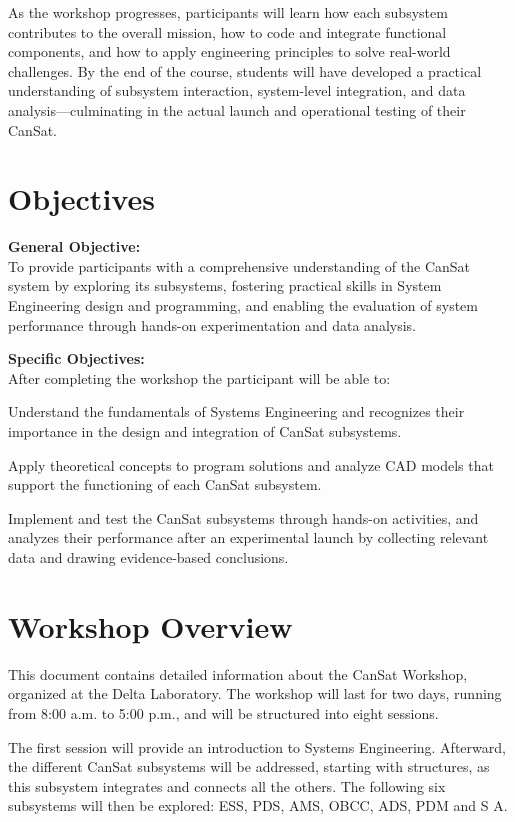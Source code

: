 \documentclass[a4paper,12pt]{article}
\begin{document}
As the workshop progresses, participants will learn how each subsystem contributes to the overall mission, how to code and integrate functional components, and how to apply engineering principles to solve real-world challenges. By the end of the course, students will have developed a practical understanding of subsystem interaction, system-level integration, and data analysis—culminating in the actual launch and operational testing of their CanSat.


\newpage

\section{Objectives}


\textbf{General Objective: }
\\
To provide participants with a comprehensive understanding of the CanSat system by exploring its subsystems, fostering practical skills in System Engineering design and programming, and enabling the evaluation of system performance through hands-on experimentation and data analysis.




\textbf{Specific Objectives:}
\\
After completing the workshop the participant will be able to:

Understand the fundamentals of Systems Engineering and recognizes their importance in the design and integration of CanSat subsystems.

Apply theoretical concepts to program solutions and analyze CAD models that support the functioning of each CanSat subsystem.

Implement and test the CanSat subsystems through hands-on activities, and analyzes their performance after an experimental launch by collecting relevant data and drawing evidence-based conclusions.


\newpage

\section{Workshop Overview}

This document contains detailed information about the CanSat Workshop, organized at the Delta Laboratory. The workshop will last for two days, running from 8:00 a.m. to 5:00 p.m., and will be structured into eight sessions.

The first session will provide an introduction to Systems Engineering. Afterward, the different CanSat subsystems will be addressed, starting with structures, as this subsystem integrates and connects all the others. The following six subsystems will then be explored: ESS, PDS, AMS, OBCC, ADS, PDM and S A. 
\end{document}
